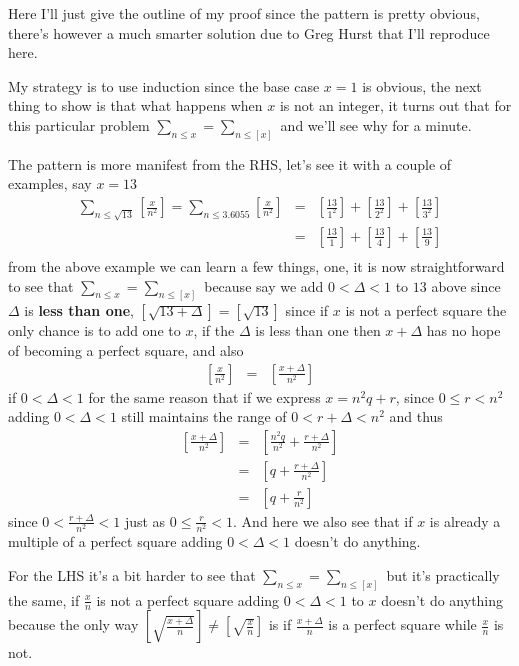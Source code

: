 \documentclass[aps,preprint,preprintnumbers,nofootinbib,showpacs,prd]{revtex4-1}
\newcommand{\nbea}{\begin{eqnarray*}}
\newcommand{\neea}{\end{eqnarray*}}
\begin{document}
Here I'll just give the outline of my proof since the pattern is pretty obvious, there's however a much smarter solution due to Greg Hurst that I'll reproduce here.

My strategy is to use induction since the base case $x = 1$ is obvious, the next thing to show is that what happens when $x$ is not an integer, it turns out that for this particular problem $\sum_{n \le x} = \sum_{n \le [x]}$ and we'll see why for a minute.

The pattern is more manifest from the RHS, let's see it with a couple of examples, say $x = 13$
%
\nbea
\sum_{n \le \sqrt{13}} \left \lbrack \frac{x}{n^2} \right \rbrack = \sum_{n \le 3.6055} \left \lbrack \frac{x}{n^2} \right \rbrack & = & \left \lbrack \frac{13}{1^2} \right \rbrack + \left \lbrack \frac{13}{2^2} \right \rbrack + \left \lbrack \frac{13}{3^2} \right \rbrack \\
& = & \left \lbrack \frac{13}{1} \right \rbrack + \left \lbrack \frac{13}{4} \right \rbrack + \left \lbrack \frac{13}{9} \right \rbrack \\
\neea
%
from the above example we can learn a few things, one, it is now straightforward to see that $\sum_{n \le x} = \sum_{n \le [x]}$ because say we add $0 < \Delta < 1$ to $13$ above since $\Delta$ is {\bf less than one}, $[\sqrt{13 + \Delta}] = [\sqrt{13}]$ since if $x$ is not a perfect square the only chance is to add one to $x$, if the $\Delta$ is less than one then $x + \Delta$ has no hope of becoming a perfect square, and also
%
\nbea
\left \lbrack \frac{x}{n^2} \right \rbrack & = & \left \lbrack \frac{x + \Delta}{n^2} \right \rbrack
\neea
%
if $0 < \Delta < 1$ for the same reason that if we express $x = n^2q + r$, since $0 \le r < n^2$ adding $0 < \Delta < 1$ still maintains the range of $0 < r  + \Delta< n^2$ and thus
%
\nbea
\left \lbrack \frac{x + \Delta}{n^2} \right \rbrack & = & \left \lbrack \frac{n^2q}{n^2} + \frac{r + \Delta}{n^2} \right  \rbrack \\
& = & \left \lbrack q + \frac{r + \Delta}{n^2} \right \rbrack \\
& = & \left \lbrack q + \frac{r}{n^2} \right \rbrack
\neea
%
since $0 <\frac{r + \Delta}{n^2} < 1$ just as $0 \le \frac{r}{n^2} < 1$. And here we also see that if $x$ is already a multiple of a perfect square adding $0 < \Delta < 1$ doesn't do anything.

For the LHS it's a bit harder to see that $\sum_{n \le x} = \sum_{n \le [x]}$ but it's practically the same, if $\frac{x}{n}$ is not a perfect square adding $0 < \Delta < 1$ to $x$ doesn't do anything because the only way $\left \lbrack \sqrt{\frac{x + \Delta}{n}} \right \rbrack \neq \left \lbrack \sqrt{\frac{x}{n}} \right \rbrack$ is if $\frac{x + \Delta}{n}$ is a perfect square while $\frac{x}{n}$ is not.
\end{document}
